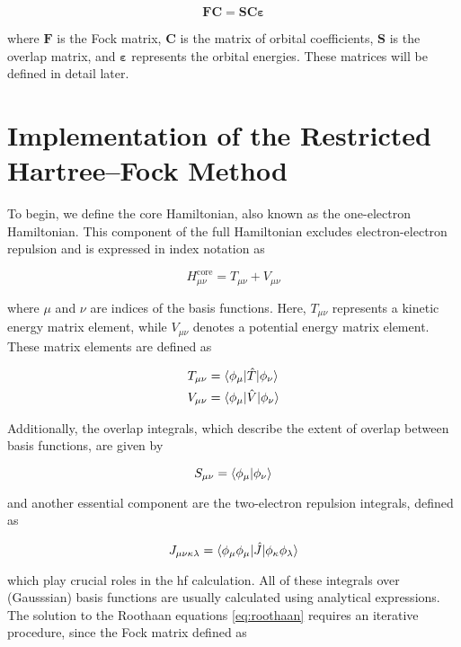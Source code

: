 \begin{equation}\label{eq:roothaan}
\mathbf{FC}=\mathbf{SC}\bm{\varepsilon}
\end{equation}

where \(\mathbf{F}\) is the Fock matrix, \(\mathbf{C}\) is the matrix of orbital coefficients, \(\mathbf{S}\) is the overlap matrix, and \(\bm{\varepsilon}\) represents the orbital energies. These matrices will be defined in detail later.

\section{Implementation of the Restricted Hartree--Fock Method}

To begin, we define the core Hamiltonian, also known as the one-electron Hamiltonian. This component of the full Hamiltonian excludes electron-electron repulsion and is expressed in index notation as

\begin{equation}\label{eq:hamiltonian}
H_{\mu\nu}^{\mathrm{core}}=T_{\mu\nu}+V_{\mu\nu}
\end{equation}

where \(\mu\) and \(\nu\) are indices of the basis functions. Here, \(T_{\mu\nu}\) represents a kinetic energy matrix element, while \(V_{\mu\nu}\) denotes a potential energy matrix element. These matrix elements are defined as

\begin{align}
T_{\mu\nu}&=\braket{\phi_{\mu}|\hat{T}|\phi_{\nu}} \\
V_{\mu\nu}&=\braket{\phi_{\mu}|\hat{V}|\phi_{\nu}}
\end{align}

Additionally, the overlap integrals, which describe the extent of overlap between basis functions, are given by

\begin{equation}\label{eq:overlap}
S_{\mu\nu}=\braket{\phi_{\mu}|\phi_{\nu}}
\end{equation}

and another essential component are the two-electron repulsion integrals, defined as

\begin{equation}\label{eq:coulomb}
J_{\mu\nu\kappa\lambda}=\braket{\phi_{\mu}\phi_{\mu}|\hat{J}|\phi_{\kappa}\phi_{\lambda}}
\end{equation}

which play crucial roles in the \acrshort{hf} calculation. All of these integrals over (Gausssian) basis functions are usually calculated using analytical expressions.\cite{10.1016/S0065-3276!08!60019-2} The solution to the Roothaan equations \eqref{eq:roothaan} requires an iterative procedure, since the Fock matrix defined as

